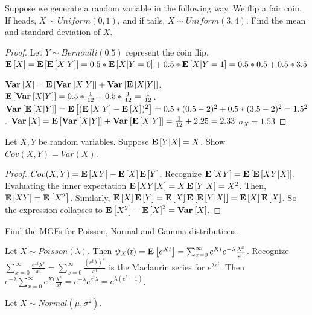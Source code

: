 \documentclass[10pt]{article}
\begin{document}
\setcounter{exercise}{12}
\begin{exercise}
    Suppose we generate a random variable in the following way. We flip a fair
    coin. If heads, $X \sim Uniform(0, 1)$, and if tails, $X \sim Uniform(3,
    4)$. Find the mean and standard deviation of $X$.
\end{exercise}

\begin{proof}
    Let $Y \sim Bernoulli(0.5)$ represent the coin flip.
    $\E{X} = \E{\E{X|Y}} = 0.5 * \E{X|Y=0} + 0.5 * \E{X|Y=1} = 0.5 * 0.5 + 0.5 * 3.5$

    $\Var{X} = \E{\Var{X|Y}} + \Var{\E{X|Y}}$. $\E{\Var{X|Y}} = 0.5 *
    \frac{1}{12} + 0.5 * \frac{1}{12} = \frac{1}{12}$. $\Var{\E{X|Y}} =
    \E{(\E{X|Y} - \E{X})^2} = 0.5 * (0.5 - 2)^2 + 0.5 * (3.5 -2)^2 = 1.5^2$.
    $\Var{X} = \E{\Var{X|Y}} + \Var{\E{X|Y}} = \frac{1}{12} + 2.25 = 2.33$
    $\sigma_X = 1.53$
\end{proof}

\setcounter{exercise}{20}
\begin{exercise}
    Let $X,Y$ be random variables. Suppose $\E{Y|X} = X$. Show $Cov(X, Y) =
    Var(X)$.
\end{exercise}

\begin{proof}
$Cov(X, Y) = \E{XY} - \E{X}\E{Y}$. Recognize $\E{XY} = \E{\E{XY|X}}$.
Evaluating the inner expectation $\E{XY|X} = X\E{Y|X} = X^2$. Then, $\E{XY}=
\E{X^2}$. Similarly, $\E{X}\E{Y} = \E{X}\E{\E{Y|X}} = \E{X}\E{X}$. So the
expression collapses to $\E{X^2} - \E{X}^2 = \Var{X}$.
\end{proof}

\setcounter{exercise}{22}
\begin{exercise}
    Find the MGFs for Poisson, Normal and Gamma distributions.
\end{exercise}

\begin{exercise}
    Let $X \sim Poisson(\lambda)$. Then $\psi_X(t) = \E{e^{Xt}} =
    \sum_{x=0}^{\infty} e^{Xt} e^{-\lambda} \frac{\lambda^x}{x!}$. Recognize
    $\sum_{x=0}^{\infty} \frac{e^{xt}\lambda^{x}}{x!} = \sum_{x=0}^{\infty}
    \frac{(e^t\lambda)^x}{x!}$ is the Maclaurin series for $e^{\lambda e^t}$.
    Then $e^{-\lambda} \sum_{x=0}^{\infty} e^{Xt} \frac{\lambda^x}{x!} =
    e^{-\lambda}e^{e^t\lambda} = e^{\lambda(e^t-1)}$.

    Let $X \sim Normal(\mu, \sigma^2)$.

\end{exercise}
\end{document}
